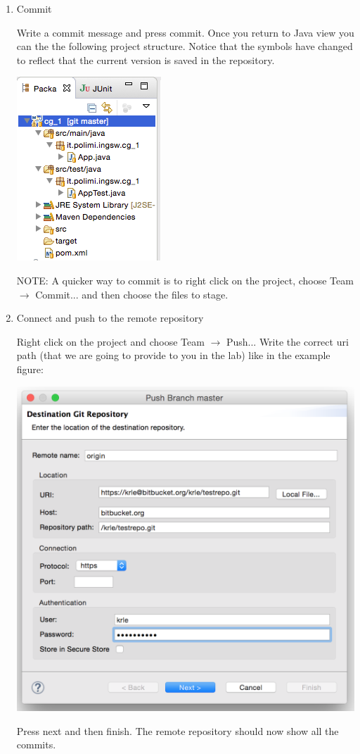 \documentclass{article}
\begin{document}
\begin{enumerate}
\item Commit

Write a commit message and press commit.
Once you return to Java view you can the the following project
structure. Notice that the symbols have changed to reflect that the
current version is saved in the repository.

\begin{center}
\includegraphics[scale=0.6]{figures/s9.png}
\end{center}

NOTE: A quicker way to commit is to right click on the project, choose 
Team $\rightarrow$ Commit... and then choose the files to stage.

\item Connect and push to the remote repository

Right click on the project and choose Team $\rightarrow$ Push...
Write the correct uri path (that we are going to provide to you in the
lab) like in the example figure: 

\begin{center}
\includegraphics[scale=0.35]{figures/s10.png}
\end{center}

Press next and then finish.
The remote repository should now show all the commits.

\end{enumerate}
\end{document}
